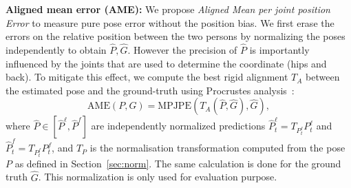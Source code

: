 \noindent\textbf{Aligned mean error (AME):}
We propose \textit{Aligned Mean per joint position Error} to measure pure pose error without the position bias. 
We first erase the errors on the relative position between the two persons by normalizing the poses independently to obtain $\hat{P},\hat{G}$. However the precision of $\hat{P}$ is importantly influenced by the joints that are used to determine the coordinate (hips and back). To mitigate this effect, we compute the best rigid alignment $T_A$ between the estimated pose and the ground-truth {using Procrustes analysis}~\cite{gower1975generalized}:
\begin{equation}
\textrm{AME}(P,G) = \textrm{MPJPE}(T_A(\hat{P}, \hat{G}), \hat{G}),
\label{equ:ampjpe}
\end{equation}
where $\hat{P} \in [\hat{P}^\ell, \hat{P}^f]$ are independently normalized predictions $\hat{P}^\ell_t = T_{P^\ell_t}P^\ell_{t}$ and $\hat{P}_{t}^f = T_{P^f_{t}}P^f_{t}$, and  $T_P$ is the normalisation transformation computed from the pose $P$ as defined in Section~\ref{sec:norm}. The same calculation is done for the ground truth $\hat{G}$. This normalization is only used for evaluation purpose.



